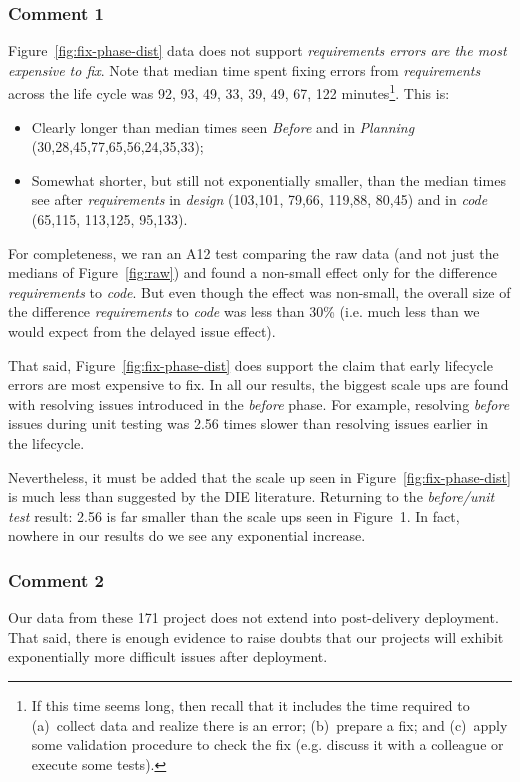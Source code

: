 \documentclass{sig-alternate}
\newcommand{\bi}{\begin{itemize}}%
\newcommand{\ei}{\end{itemize}}
\newcommand{\fig}[1]{Figure~\ref{fig:#1}}
\begin{document}
\subsubsection{Comment 1}
Figure~\ref{fig:fix-phase-dist}
 data does not support   
{\em  requirements errors are the most expensive to fix}.
Note that   median time spent fixing errors from {\em requirements} across the life cycle was 92, 93,  49, 33, 39, 49, 67, 122 minutes\footnote{If this time seems long, then recall
that it includes the time required  to (a)~collect data and realize there is an error;
(b)~prepare a fix;  and (c)~apply some validation
procedure to check the fix (e.g. discuss it with a colleague or execute some tests).}.
This is:
\bi
\item
Clearly longer than median times seen {\em Before } and in {\em Planning}
(30,28,45,77,65,56,24,35,33);
\item
Somewhat shorter, but still not exponentially smaller,  than the median times see after {\em requirements} in {\em design}
(103,101, 79,66, 119,88, 80,45) and in {\em code} (65,115, 113,125, 95,133). 
\ei
For completeness, we ran an  
A12 test comparing the raw data (and not just the medians of \fig{raw}) and found
 a non-small effect only for the difference {\em requirements}
to {\em code}. But even though the effect was non-small, 
 the overall size of the difference
{\em requirements} to {\em code} was less than 30\% (i.e. much less than we would
expect from the delayed issue effect). 

That said, Figure~\ref{fig:fix-phase-dist} does support the 
claim that early lifecycle errors are most expensive to fix.
In all our results, the biggest scale ups are found with resolving
issues introduced in the {\em before} phase. For example,
resolving {\em before} issues during unit testing was 2.56 times
slower than resolving issues earlier in the lifecycle. 

Nevertheless,  it must be added that the scale up seen in 
Figure~\ref{fig:fix-phase-dist} 
is much less
than suggested by the DIE literature. Returning to
the {\em before/unit test} result: 2.56 is far smaller
than the scale ups seen in Figure~1. In fact, nowhere in 
our results do we see any exponential increase.

\newpage\subsubsection{Comment 2}
Our data from these 171 project does not extend into post-delivery deployment. That said,
there is enough evidence to raise doubts that our projects will exhibit exponentially more
difficult issues after deployment. 
\end{document}
